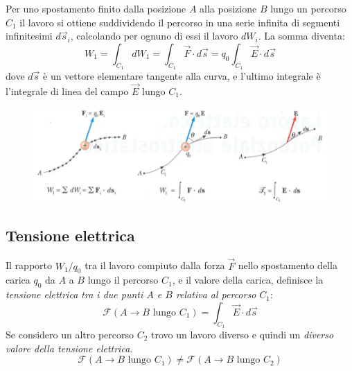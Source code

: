 \documentclass[class=book, crop=false, oneside, 12pt]{standalone}
\begin{document}
Per uno spostamento finito dalla posizione \(A\) alla posizione \(B\) lungo un percorso \(C_1\) il lavoro si ottiene suddividendo il percorso in una serie infinita di segmenti infinitesimi \(d \overrightarrow{s}_i\), calcolando per ognuno di essi il lavoro \(dW_i\).
La somma diventa:
\begin{equation} \label{lavoro_elettrostatico}
    W_1 = \int_{C_1} d W_1 = \int_{C_1} \overrightarrow{F} \cdot d \overrightarrow{s} = q_0 \int_{C_1} \overrightarrow{E} \cdot d \overrightarrow{s}
\end{equation}
dove \(d \overrightarrow{s}\) è un vettore elementare tangente alla curva, e l'ultimo integrale è l'integrale di linea del campo \(\overrightarrow{E}\) lungo \(C_1\).

\begin{figure}[h]
    \includegraphics[scale=0.6]{lavoro_tensione_elettrostatica.png}
    \centering
    \caption{}
\end{figure}

\subsection{Tensione elettrica}

Il rapporto \(W_1 / q_0\) tra il lavoro compiuto dalla forza \(\overrightarrow{F}\) nello spostamento della carica \(q_0\) da \(A\) a \(B\) lungo il percorso \(C_1\), e il valore della carica, definisce la \emph{tensione elettrica tra i due punti \(A\) e \(B\) relativa al percorso \(C_1\)}:
\begin{equation}
    \mathcal{F} \left(A \rightarrow B \text{ lungo } C_1\right) = \int_{C_1} \overrightarrow{E} \cdot d \overrightarrow{s}
\end{equation}
Se considero un altro percorso \(C_2\) trovo un lavoro diverso e quindi un \emph{diverso valore della tensione elettrica}.
\begin{equation*}
    \mathcal{F} \left(A \rightarrow B \text{ lungo } C_1\right) \neq \mathcal{F} \left(A \rightarrow B \text{ lungo } C_2\right)
\end{equation*}
\end{document}
